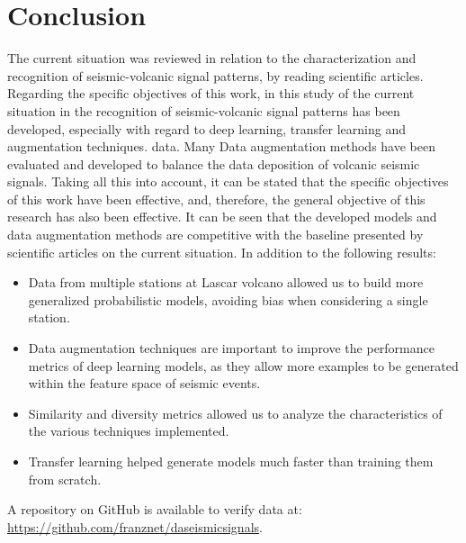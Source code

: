 \documentclass[journal]{IEEEtran}
\begin{document}


\section{Conclusion}
The current situation was reviewed in relation to the characterization and recognition of seismic-volcanic signal patterns, by reading scientific articles.
Regarding the specific objectives of this work, in this study of the current situation in the recognition of seismic-volcanic signal patterns has been developed, especially with regard to deep learning, transfer learning and augmentation techniques. data. Many Data augmentation methods have been evaluated and developed to balance the data deposition of volcanic seismic signals. Taking all this into account, it can be stated that the specific objectives of this work have been effective, and, therefore, the general objective of this research has also been effective.
It can be seen that the developed models and data augmentation methods are competitive with the baseline presented by scientific articles on the current situation. In addition to the following results:
\begin{itemize}
 \item Data from multiple stations at Lascar volcano allowed us to build more generalized probabilistic models, avoiding bias when considering a single station.
 \item Data augmentation techniques are important to improve the performance metrics of deep learning models, as they allow more examples to be generated within the feature space of seismic events.
 \item Similarity and diversity metrics allowed us to analyze the characteristics of the various techniques implemented. 
 \item Transfer learning helped generate models much faster than training them from scratch.
\end{itemize}

A repository on GitHub is available to verify data at: \href{https://github.com/franznet/daseismicsignals}{\color{blue}https://github.com/franznet/daseismicsignals}.
\end{document}
